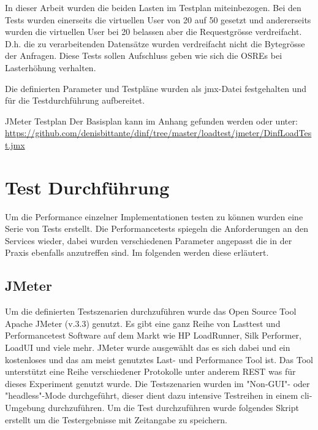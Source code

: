 \documentclass[main.tex]{subfiles}
\begin{document}
In dieser Arbeit wurden die beiden Lasten im Testplan miteinbezogen. Bei den Tests wurden einerseits die virtuellen User von 20 auf 50 gesetzt und andererseits wurden die virtuellen User bei 20 belassen aber die Requestgrösse verdreifacht. D.h. die zu verarbeitenden Datensätze wurden verdreifacht nicht die Bytegrösse der Anfragen.
Diese Tests sollen Aufschluss geben wie sich die OSREs bei Lasterhöhung verhalten.

Die definierten Parameter und Testpläne wurden als jmx-Datei festgehalten und für die Testdurchführung aufbereitet. 

\begin{reference}{JMeter Testplan}
Der Basisplan kann im Anhang gefunden werden oder unter: 
 \url{https://github.com/denisbittante/dinf/tree/master/loadtest/jmeter/DinfLoadTest.jmx}
 
\end{reference}



\section{Test Durchführung}


Um die Performance einzelner Implementationen testen zu können wurden eine Serie von Tests erstellt. Die Performancetests spiegeln die Anforderungen an den Services wieder, dabei wurden verschiedenen Parameter angepasst die in der Praxis ebenfalls anzutreffen sind. Im folgenden werden diese erläutert.

\subsection{JMeter}


Um die definierten Testszenarien durchzuführen wurde  das Open Source Tool Apache JMeter (v.3.3) genutzt. Es gibt eine ganz Reihe von Lasttest und Performancetest Software auf dem Markt wie HP LoadRunner, Silk Performer, LoadUI und viele mehr. JMeter wurde ausgewählt das es sich dabei und ein kostenloses und das am meist genutztes Last- und Performance Tool ist. Das Tool unterstützt eine Reihe verschiedener Protokolle unter anderem REST was für dieses Experiment genutzt wurde. Die Testszenarien wurden  im "Non-GUI"- oder "headless"-Mode durchgeführt, dieser dient dazu intensive Testreihen in einem \acrshort{cli}-Umgebung durchzuführen.
Um die Test durchzuführen wurde  folgendes Skript erstellt um die Testergebnisse mit Zeitangabe zu speichern.
\end{document}
